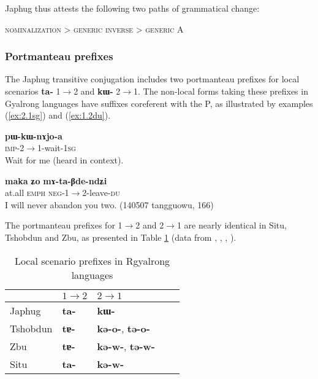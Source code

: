 \documentclass[oldfontcommands,oneside,a4paper,11pt]{article}
\newcommand{\ipa}[1]{\mbox{\phon\textbf{#1}}} %
\begin{document}
Japhug thus attests the following two paths of grammatical change:

\begin{exe}
\ex 
\glt \textsc{nominalization} > \textsc{generic} 
\ex 
\glt \textsc{inverse} > \textsc{generic A}
\end{exe}

\subsubsection{Portmanteau prefixes}
The Japhug transitive conjugation includes two portmanteau prefixes for local scenarios \ipa{ta-} 1$\rightarrow$2 and \ipa{kɯ-} 2$\rightarrow$1.  The non-local forms taking these prefixes in Gyalrong languages have suffixes coreferent with the P, as illustrated by examples (\ref{ex:2.1sg}) and (\ref{ex:1.2du}).

\begin{exe}
\ex \label{ex:2.1sg}
\gll \ipa{pɯ-kɯ-nɤjo-a} \\
\textsc{imp}-2$\rightarrow$1-wait-\textsc{1sg} \\
\glt Wait for me (heard in context).
\end{exe}

\begin{exe}
\ex \label{ex:1.2du}
\gll  \ipa{maka} 	\ipa{ʑo} 	\ipa{mɤ-ta-βde-ndʑi} \\
at.all \textsc{emph} \textsc{neg}-1$\rightarrow$2-leave-\textsc{du} \\
\glt I will never abandon you two. (140507 tangguowu, 166)
\end{exe}

The portmanteau prefixes for 1$\rightarrow$2 and 2$\rightarrow$1 are nearly identical in Situ, Tshobdun and Zbu, as presented in Table \ref{tab:local.rgy} (data from \citealt[218]{linxr93jiarong}, \citealt{jackson02rentongdengdi}, \citealt{jacques12agreement}, \citealt{gongxun14agreement}).

\begin{table}[H]
\caption{Local scenario prefixes in Rgyalrong languages} \centering \label{tab:local.rgy} 
\begin{tabular}{lllll}
\toprule
& $1\rightarrow2$ & $2\rightarrow1$ \\
\midrule
Japhug &  \ipa{ta-} & \ipa{kɯ-} \\
Tshobdun &  \ipa{tɐ-} & \ipa{kə-o-}, \ipa{tə-o-} \\
Zbu &  \ipa{tɐ-} &\ipa{kə-w-}, \ipa{tə-w-} \\
Situ &  \ipa{ta-} & \ipa{kə-w-} \\
\bottomrule
\end{tabular}
\end{table}
\end{document}
